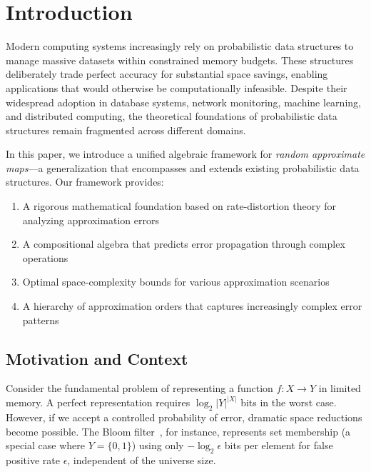 \providecommand{\mainx}{..}
\section{Introduction}

Modern computing systems increasingly rely on probabilistic data structures to manage massive datasets within constrained memory budgets.
These structures deliberately trade perfect accuracy for substantial space savings, enabling applications that would otherwise be computationally infeasible.
Despite their widespread adoption in database systems, network monitoring, machine learning, and distributed computing, the theoretical foundations of probabilistic data structures remain fragmented across different domains.

In this paper, we introduce a unified algebraic framework for \emph{random approximate maps}---a generalization that encompasses and extends existing probabilistic data structures.
Our framework provides:
\begin{enumerate}
    \item A rigorous mathematical foundation based on rate-distortion theory for analyzing approximation errors
    \item A compositional algebra that predicts error propagation through complex operations
    \item Optimal space-complexity bounds for various approximation scenarios
    \item A hierarchy of approximation orders that captures increasingly complex error patterns
\end{enumerate}

\subsection{Motivation and Context}

Consider the fundamental problem of representing a function $f: X \to Y$ in limited memory.
A perfect representation requires $\log_2 |Y|^{|X|}$ bits in the worst case.
However, if we accept a controlled probability of error, dramatic space reductions become possible.
The Bloom filter~\cite{bloom1970}, for instance, represents set membership (a special case where $Y = \{0,1\}$) using only $-\log_2 \epsilon$ bits per element for false positive rate $\epsilon$, independent of the universe size.

